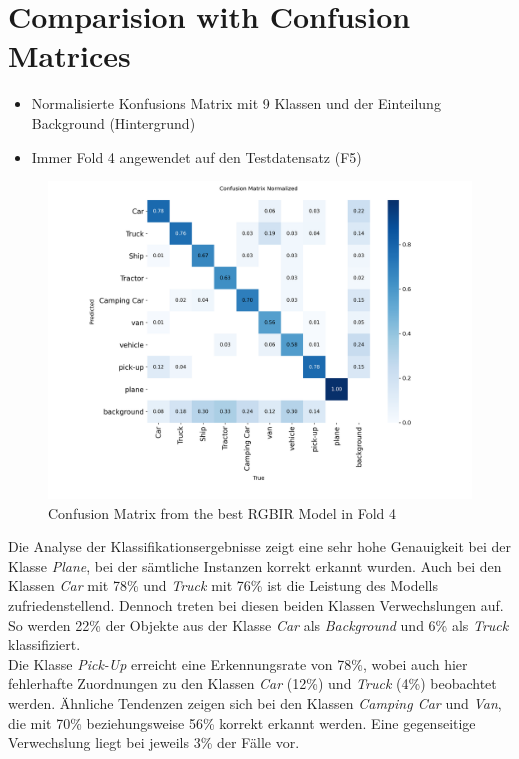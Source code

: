 \section{Comparision with Confusion Matrices}
\begin{itemize}
    \item Normalisierte Konfusions Matrix mit 9 Klassen und der Einteilung Background (Hintergrund)
    \item Immer Fold 4 angewendet auf den Testdatensatz (F5)
\end{itemize}

\begin{figure}[h] 
    \centering %
    \includegraphics[width=\textwidth]{images/confusion_matrices/rgbir_F4_confusion_matrix_normalized.png} %
        \caption{Confusion Matrix from the best RGBIR Model in Fold 4} %
        \label{fig:cm_rgbir} %
\end{figure}
Die Analyse der Klassifikationsergebnisse zeigt eine sehr hohe Genauigkeit bei der Klasse \textit{Plane}, bei der sämtliche Instanzen korrekt erkannt wurden. Auch bei den Klassen \textit{Car} mit 78\% und \textit{Truck} mit 76\% ist die Leistung des Modells zufriedenstellend. Dennoch treten bei diesen beiden Klassen Verwechslungen auf. So werden 22\% der Objekte aus der Klasse \textit{Car} als \textit{Background} und 6\% als \textit{Truck} klassifiziert.\\
Die Klasse \textit{Pick-Up} erreicht eine Erkennungsrate von 78\%, wobei auch hier fehlerhafte Zuordnungen zu den Klassen \textit{Car} (12\%) und \textit{Truck} (4\%) beobachtet werden. Ähnliche Tendenzen zeigen sich bei den Klassen \textit{Camping Car} und \textit{Van}, die mit 70\% beziehungsweise 56\% korrekt erkannt werden. Eine gegenseitige Verwechslung liegt bei jeweils 3\% der Fälle vor.\\
